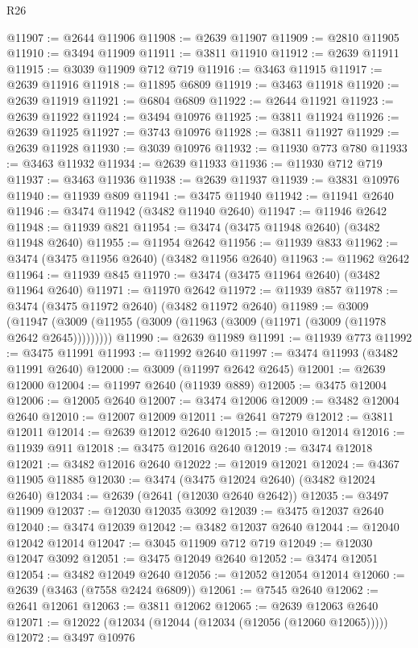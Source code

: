 \begin{lexlean}{R26}
\begin{coremodule}
@11907 := @2644 @11906
@11908 := @2639 @11907
@11909 := @2810 @11905
@11910 := @3494 @11909
@11911 := @3811 @11910
@11912 := @2639 @11911
@11915 := @3039 @11909 @712 @719
@11916 := @3463 @11915
@11917 := @2639 @11916
@11918 := @11895 @6809
@11919 := @3463 @11918
@11920 := @2639 @11919
@11921 := @6804 @6809
@11922 := @2644 @11921
@11923 := @2639 @11922
@11924 := @3494 @10976
@11925 := @3811 @11924
@11926 := @2639 @11925
@11927 := @3743 @10976
@11928 := @3811 @11927
@11929 := @2639 @11928
@11930 := @3039 @10976
@11932 := @11930 @773 @780
@11933 := @3463 @11932
@11934 := @2639 @11933
@11936 := @11930 @712 @719
@11937 := @3463 @11936
@11938 := @2639 @11937
@11939 := @3831 @10976
@11940 := @11939 @809
@11941 := @3475 @11940
@11942 := @11941 @2640
@11946 := @3474 @11942 (@3482 @11940 @2640)
@11947 := @11946 @2642
@11948 := @11939 @821
@11954 := @3474 (@3475 @11948 @2640) (@3482 @11948 @2640)
@11955 := @11954 @2642
@11956 := @11939 @833
@11962 := @3474 (@3475 @11956 @2640) (@3482 @11956 @2640)
@11963 := @11962 @2642
@11964 := @11939 @845
@11970 := @3474 (@3475 @11964 @2640) (@3482 @11964 @2640)
@11971 := @11970 @2642
@11972 := @11939 @857
@11978 := @3474 (@3475 @11972 @2640) (@3482 @11972 @2640)
@11989 := @3009
    (@11947 (@3009 (@11955 (@3009 (@11963 (@3009 (@11971 (@3009 (@11978 @2642 @2645)))))))))
@11990 := @2639 @11989
@11991 := @11939 @773
@11992 := @3475 @11991
@11993 := @11992 @2640
@11997 := @3474 @11993 (@3482 @11991 @2640)
@12000 := @3009 (@11997 @2642 @2645)
@12001 := @2639 @12000
@12004 := @11997 @2640 (@11939 @889)
@12005 := @3475 @12004
@12006 := @12005 @2640
@12007 := @3474 @12006
@12009 := @3482 @12004 @2640
@12010 := @12007 @12009
@12011 := @2641 @7279
@12012 := @3811 @12011
@12014 := @2639 @12012 @2640
@12015 := @12010 @12014
@12016 := @11939 @911
@12018 := @3475 @12016 @2640
@12019 := @3474 @12018
@12021 := @3482 @12016 @2640
@12022 := @12019 @12021
@12024 := @4367 @11905 @11885
@12030 := @3474 (@3475 @12024 @2640) (@3482 @12024 @2640)
@12034 := @2639 (@2641 (@12030 @2640 @2642))
@12035 := @3497 @11909
@12037 := @12030 @12035 @3092
@12039 := @3475 @12037 @2640
@12040 := @3474 @12039
@12042 := @3482 @12037 @2640
@12044 := @12040 @12042 @12014
@12047 := @3045 @11909 @712 @719
@12049 := @12030 @12047 @3092
@12051 := @3475 @12049 @2640
@12052 := @3474 @12051
@12054 := @3482 @12049 @2640
@12056 := @12052 @12054 @12014
@12060 := @2639 (@3463 (@7558 @2424 @6809))
@12061 := @7545 @2640
@12062 := @2641 @12061
@12063 := @3811 @12062
@12065 := @2639 @12063 @2640
@12071 := @12022 (@12034 (@12044 (@12034 (@12056 (@12060 @12065)))))
@12072 := @3497 @10976

\end{coremodule}
\end{lexlean}

